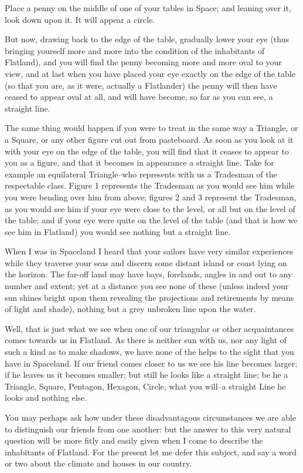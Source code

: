 \documentclass[edeposit,fullpage]{uiucthesis2009}
\begin{document}
Place a penny on the middle of one of your tables in Space; and leaning
over it, look down upon it.  It will appear a circle.

But now, drawing back to the edge of the table, gradually lower your
eye (thus bringing yourself more and more into the condition of the
inhabitants of Flatland), and you will find the penny becoming more and
more oval to your view, and at last when you have placed your eye
exactly on the edge of the table (so that you are, as it were, actually
a Flatlander) the penny will then have ceased to appear oval at all,
and will have become, so far as you can see, a straight line.

The same thing would happen if you were to treat in the same way a
Triangle, or a Square, or any other figure cut out from pasteboard.  As
soon as you look at it with your eye on the edge of the table, you will
find that it ceases to appear to you as a figure, and that it becomes
in appearance a straight line.  Take for example an equilateral
Triangle--who represents with us a Tradesman of the respectable class.
Figure 1 represents the Tradesman as you would see him while you were
bending over him from above; figures 2 and 3 represent the Tradesman,
as you would see him if your eye were close to the level, or all but on
the level of the table; and if your eye were quite on the level of the
table (and that is how we see him in Flatland) you would see nothing
but a straight line.

When I was in Spaceland I heard that your sailors have very similar
experiences while they traverse your seas and discern some distant
island or coast lying on the horizon.  The far-off land may have bays,
forelands, angles in and out to any number and extent; yet at a
distance you see none of these (unless indeed your sun shines bright
upon them revealing the projections and retirements by means of light
and shade), nothing but a grey unbroken line upon the water.

Well, that is just what we see when one of our triangular or other
acquaintances comes towards us in Flatland.  As there is neither sun
with us, nor any light of such a kind as to make shadows, we have none
of the helps to the sight that you have in Spaceland.  If our friend
comes closer to us we see his line becomes larger; if he leaves us it
becomes smaller; but still he looks like a straight line; be he a
Triangle, Square, Pentagon, Hexagon, Circle, what you will--a straight
Line he looks and nothing else.

You may perhaps ask how under these disadvantagous circumstances we are
able to distinguish our friends from one another: but the answer to
this very natural question will be more fitly and easily given when I
come to describe the inhabitants of Flatland.  For the present let me
defer this subject, and say a word or two about the climate and houses
in our country.
\end{document}
